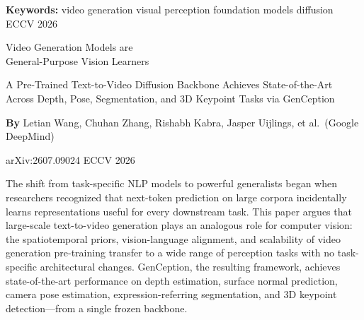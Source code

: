 \documentclass[10pt,twocolumn]{article}
\begin{document}
\setlength{\parindent}{0pt}
\setlength{\parskip}{4pt}

{\small\color{keywordgray}\textbf{Keywords:}
  video generation \textbullet{}
  visual perception \textbullet{}
  foundation models \textbullet{}
  diffusion \textbullet{}
  ECCV 2026}\par\vspace{4pt}

{\LARGE\bfseries\raggedright
  Video Generation Models are\\
  General-Purpose Vision Learners}\par\vspace{4pt}

{\large\itshape\raggedright
  A Pre-Trained Text-to-Video Diffusion Backbone Achieves
  State-of-the-Art Across Depth, Pose, Segmentation,
  and 3D Keypoint Tasks via GenCeption}\par\vspace{6pt}

{\small\textbf{By} Letian Wang, Chuhan Zhang, Rishabh Kabra,
  Jasper Uijlings, et al.\ (Google DeepMind)}\par\vspace{2pt}

{\small\color{keywordgray}arXiv:2607.09024 \textbullet{}
  ECCV 2026}
\par\vspace{2pt}\noindent{\color{rulered}\rule{\columnwidth}{0.6pt}}\vspace{6pt}

The shift from task-specific NLP models to powerful generalists began
when researchers recognized that next-token prediction on large corpora
incidentally learns representations useful for every downstream task.
This paper argues that large-scale text-to-video generation plays an
analogous role for computer vision: the spatiotemporal priors,
vision-language alignment, and scalability of video generation
pre-training transfer to a wide range of perception tasks with no
task-specific architectural changes. GenCeption, the resulting
framework, achieves state-of-the-art performance on depth estimation,
surface normal prediction, camera pose estimation, expression-referring
segmentation, and 3D keypoint detection---from a single frozen backbone.
\end{document}
